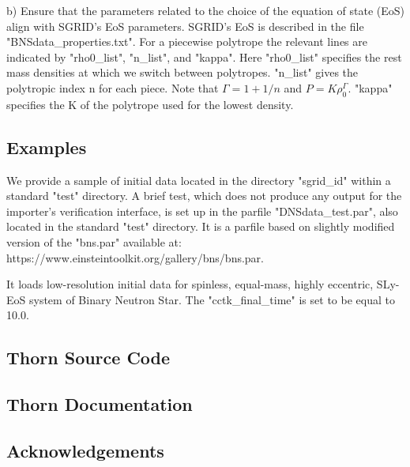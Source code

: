 b) Ensure that the parameters related to the choice of the equation of state
(EoS) align with SGRID's EoS parameters. SGRID's EoS is described in the
file "BNSdata\_properties.txt". For a piecewise polytrope the relevant lines
are indicated by "rho0\_list", "n\_list", and "kappa". Here "rho0\_list"
specifies the rest mass densities at which we switch between polytropes.
"n\_list" gives the polytropic index n for each piece. Note that
   $\Gamma = 1 + 1/n$    and    $P = K \rho_0^\Gamma$.
"kappa" specifies the K of the polytrope used for the lowest density.

\subsection{Examples}

We provide a sample of initial data located in the directory "sgrid\_id" within a standard "test" directory. A brief test, which does not produce any output for the importer's verification interface, is set up in the parfile "DNSdata\_test.par", also located in the standard "test" directory. It is a parfile based on slightly modified version of the "bns.par" available at: https://www.einsteintoolkit.org/gallery/bns/bns.par.

It loads low-resolution initial data for spinless, equal-mass, highly eccentric, SLy-EoS system of Binary Neutron Star. The "cctk\_final\_time" is set to be equal to 10.0.




\subsection{Thorn Source Code}

\subsection{Thorn Documentation}

\subsection{Acknowledgements}


\begin{thebibliography}{9}

\end{thebibliography}



